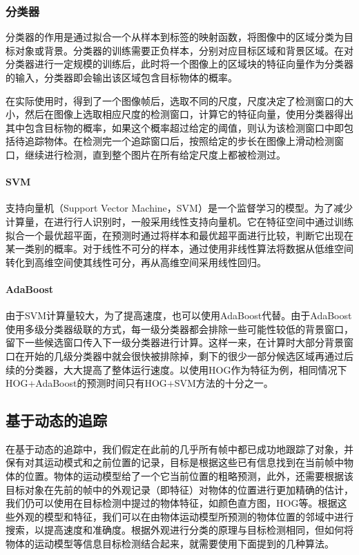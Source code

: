 \subsubsection{分类器}

  分类器的作用是通过拟合一个从样本到标签的映射函数，将图像中的区域分类为目标对象或背景。分类器的训练需要正负样本，分别对应目标区域和背景区域。在对分类器进行一定规模的训练后，此时将一个图像上的区域块的特征向量作为分类器的输入，分类器即会输出该区域包含目标物体的概率。

  在实际使用时，得到了一个图像帧后，选取不同的尺度，尺度决定了检测窗口的大小，然后在图像上选取相应尺度的检测窗口，计算它的特征向量，使用分类器得出其中包含目标物的概率，如果这个概率超过给定的阈值，则认为该检测窗口中即包括待追踪物体。在检测完一个追踪窗口后，按照给定的步长在图像上滑动检测窗口，继续进行检测，直到整个图片在所有给定尺度上都被检测过。

\paragraph{SVM}

  支持向量机（Support Vector Machine，SVM）是一个监督学习的模型。为了减少计算量，在进行行人识别时，一般采用线性支持向量机。它在特征空间中通过训练拟合一个最优超平面，在预测时通过将样本和最优超平面进行比较，判断它出现在某一类别的概率。对于线性不可分的样本，通过使用非线性算法将数据从低维空间转化到高维空间使其线性可分，再从高维空间采用线性回归。

\paragraph{AdaBoost}

  由于SVM计算量较大，为了提高速度，也可以使用AdaBoost代替。由于AdaBoost使用多级分类器级联的方式，每一级分类器都会排除一些可能性较低的背景窗口，留下一些候选窗口传入下一级分类器进行计算。这样一来，在计算时大部分背景窗口在开始的几级分类器中就会很快被排除掉，剩下的很少一部分候选区域再通过后续的分类器，大大提高了整体运行速度。以使用HOG作为特征为例，相同情况下HOG+AdaBoost的预测时间只有HOG+SVM方法的十分之一。

\subsection{基于动态的追踪}

  在基于动态的追踪中，我们假定在此前的几乎所有帧中都已成功地跟踪了对象，并保有对其运动模式和之前位置的记录，目标是根据这些已有信息找到在当前帧中物体的位置。物体的运动模型给了一个它当前位置的粗略预测，此外，还需要根据该目标对象在先前的帧中的外观记录（即特征）对物体的位置进行更加精确的估计，我们仍可以使用在目标检测中提过的物体特征，如颜色直方图，HOG等。根据这些外观的模型和特征，我们可以在由物体运动模型所预测的物体位置的邻域中进行搜索，以提高速度和准确度。根据外观进行分类的原理与目标检测相同，但如何将物体的运动模型等信息目标检测结合起来，就需要使用下面提到的几种算法。

